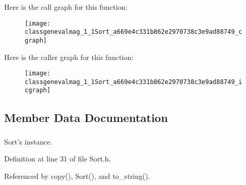 Here is the call graph for this function:\nopagebreak
\begin{figure}[H]
\begin{center}
\leavevmode
\texttt{[image: classgenevalmag\_1\_1Sort\_a669e4c331b862e2970738c3e9ad88749\_cgraph]}
\end{center}
\end{figure}




Here is the caller graph for this function:\nopagebreak
\begin{figure}[H]
\begin{center}
\leavevmode
\texttt{[image: classgenevalmag\_1\_1Sort\_a669e4c331b862e2970738c3e9ad88749\_icgraph]}
\end{center}
\end{figure}




\subsection{Member Data Documentation}
\hypertarget{classgenevalmag_1_1Sort_adc3a9ea4bfaabbb0879c18172f670ef8}{
\subsubsection[{s\_\-ins}]{}}
\label{classgenevalmag_1_1Sort_adc3a9ea4bfaabbb0879c18172f670ef8}


Sort's instance. 



Definition at line 31 of file Sort.h.



Referenced by copy(), Sort(), and to\_\-string().

\hypertarget{classgenevalmag_1_1Sort_ae6d8c2bf79cf548f731bbd4d7d9b1f4e}{
\subsubsection[{s\_\-name}]{}}
\label{classgenevalmag_1_1Sort_ae6d8c2bf79cf548f731bbd4d7d9b1f4e}


